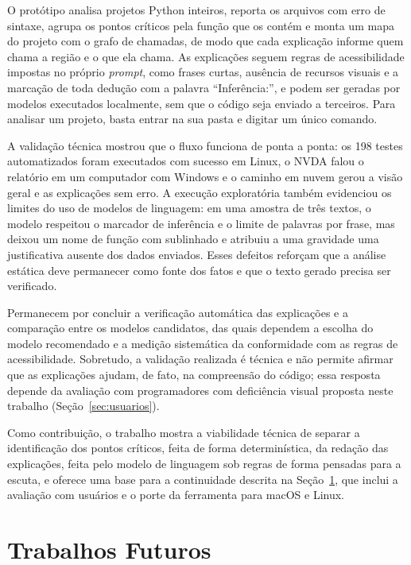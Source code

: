 \documentclass[
    12pt,                   %
    openright,              %
    oneside,                %
    a4paper,                %
    sumario=tradicional,    %
    english,                %
    brazil,                 %
    ]{abntex2}
\begin{document}
O protótipo analisa projetos Python inteiros, reporta os arquivos com erro de sintaxe, agrupa os pontos críticos pela função que os contém e monta um mapa do projeto com o grafo de chamadas, de modo que cada explicação informe quem chama a região e o que ela chama. As explicações seguem regras de acessibilidade impostas no próprio \textit{prompt}, como frases curtas, ausência de recursos visuais e a marcação de toda dedução com a palavra \enquote{Inferência:}, e podem ser geradas por modelos executados localmente, sem que o código seja enviado a terceiros. Para analisar um projeto, basta entrar na sua pasta e digitar um único comando.

A validação técnica mostrou que o fluxo funciona de ponta a ponta: os 198 testes automatizados foram executados com sucesso em Linux, o NVDA falou o relatório em um computador com Windows e o caminho em nuvem gerou a visão geral e as explicações sem erro. A execução exploratória também evidenciou os limites do uso de modelos de linguagem: em uma amostra de três textos, o modelo respeitou o marcador de inferência e o limite de palavras por frase, mas deixou um nome de função com sublinhado e atribuiu a uma gravidade uma justificativa ausente dos dados enviados. Esses defeitos reforçam que a análise estática deve permanecer como fonte dos fatos e que o texto gerado precisa ser verificado.

Permanecem por concluir a verificação automática das explicações e a comparação entre os modelos candidatos, das quais dependem a escolha do modelo recomendado e a medição sistemática da conformidade com as regras de acessibilidade. Sobretudo, a validação realizada é técnica e não permite afirmar que as explicações ajudam, de fato, na compreensão do código; essa resposta depende da avaliação com programadores com deficiência visual proposta neste trabalho (Seção~\ref{sec:usuarios}).

Como contribuição, o trabalho mostra a viabilidade técnica de separar a identificação dos pontos críticos, feita de forma determinística, da redação das explicações, feita pelo modelo de linguagem sob regras de forma pensadas para a escuta, e oferece uma base para a continuidade descrita na Seção~\ref{sec:futuros}, que inclui a avaliação com usuários e o porte da ferramenta para macOS e Linux.


\section{Trabalhos Futuros}\label{sec:futuros}
\end{document}
